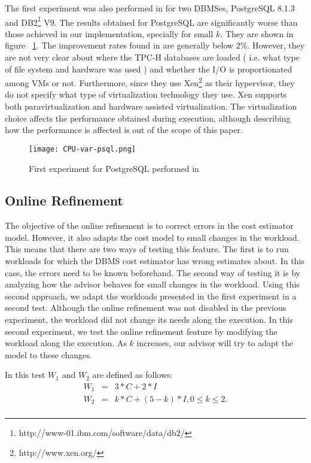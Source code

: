 The first experiment was also performed in \cite{Soror:2008:AVM:1376616.1376711} for two DBMSes, PostgreSQL 8.1.3 and DB2\footnote{http://www-01.ibm.com/software/data/db2/} V9.  The results obtained for PostgreSQL are significantly worse than those achieved in our implementation, specially for small $k$. They are shown in figure ~\ref{fig:cpuvar-psql}. The improvement rates found in \cite{Soror:2008:AVM:1376616.1376711} are generally below $2\%$. However, they are not very clear about where the TPC-H databases are loaded ( i.e. what type of file system and hardware was used ) and whether the I/O is proportionated among VMs or not. Furthermore, since they use Xen\footnote{http://www.xen.org/} as their hypervisor, they do not specify what type of virtualization technology they use. Xen supports both paravirtualization and hardware assisted virtualization. The virtualization choice affects the performance obtained during execution, although describing how the performance is affected is out of the scope of this 
paper.

\begin{figure}[ht]
 \centering
 \texttt{[image: CPU-var-psql.png]}
 \caption{First experiment for PostgreSQL performed in \cite{Soror:2008:AVM:1376616.1376711}}
 \label{fig:cpuvar-psql}
\end{figure} 

\subsection{Online Refinement}

The objective of the online refinement is to correct errors in the cost estimator model. However, it also adapts the cost model to small changes in the workload. This means that there are two ways of testing this feature. The first is to run workloads for which the DBMS cost estimator has wrong estimates about. In this case, the errors need to be known beforehand. The second way of testing it is by analyzing how the advisor behaves for small changes in the workload. Using this second approach, we adapt the workloads presented in the first experiment in a second test. Although the online refinement was not disabled in the previous experiment, the workload did not change its needs along the execution. In this second experiment, we test the online refinement feature by modifying the workload along the execution. As $k$ increases, our advisor will try to adapt the model to these changes.

In this test $W_{1}$ and $W_{2}$ are defined as follows:
\begin{eqnarray*}
 W_{1} &=& 3*C + 2*I \\
 W_{2} &=& k*C + (5-k)*I, 0 \leq k \leq 2. \\
\end{eqnarray*}

